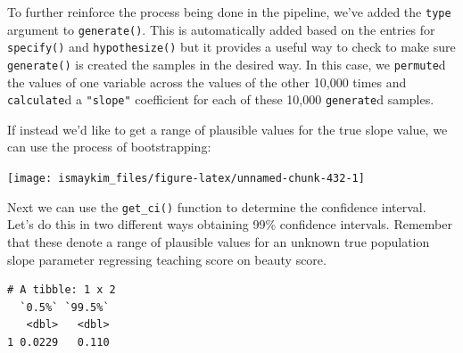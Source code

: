 \documentclass[12pt,]{krantz}
\makeatletter
\newenvironment{Shaded}{\begin{snugshade}}{\end{snugshade}}
\newcommand{\KeywordTok}[1]{\textcolor[rgb]{0.27,0.27,0.27}{\textbf{#1}}}
\newcommand{\DataTypeTok}[1]{\textcolor[rgb]{0.27,0.27,0.27}{#1}}
\newcommand{\FloatTok}[1]{\textcolor[rgb]{0.06,0.06,0.06}{#1}}
\newcommand{\StringTok}[1]{\textcolor[rgb]{0.5,0.5,0.5}{#1}}
\newcommand{\OperatorTok}[1]{\textcolor[rgb]{0.43,0.43,0.43}{\textbf{#1}}}
\newcommand{\NormalTok}[1]{#1}
\newenvironment{kframe}{%
\medskip{}
\setlength{\fboxsep}{.8em}
 \def\at@end@of@kframe{}%
 \ifinner\ifhmode%
  \def\at@end@of@kframe{\end{minipage}}%
  \begin{minipage}{\columnwidth}%
 \fi\fi%
 \def\FrameCommand##1{\hskip\@totalleftmargin \hskip-\fboxsep
 \colorbox{shadecolor}{##1}\hskip-\fboxsep
     \hskip-\linewidth \hskip-\@totalleftmargin \hskip\columnwidth}%
 \MakeFramed {\advance\hsize-\width
   \@totalleftmargin\z@ \linewidth\hsize
   \@setminipage}}%
 {\par\unskip\endMakeFramed%
 \at@end@of@kframe}
\renewenvironment{Shaded}{\begin{kframe}}{\end{kframe}}
\makeatother
\begin{document}
To further reinforce the process being done in the pipeline, we've added
the \texttt{type} argument to \texttt{generate()}. This is automatically
added based on the entries for \texttt{specify()} and
\texttt{hypothesize()} but it provides a useful way to check to make
sure \texttt{generate()} is created the samples in the desired way. In
this case, we \texttt{permute}d the values of one variable across the
values of the other 10,000 times and \texttt{calculate}d a
\texttt{"slope"} coefficient for each of these 10,000 \texttt{generate}d
samples.

If instead we'd like to get a range of plausible values for the true
slope value, we can use the process of bootstrapping:

\begin{Shaded}
\end{Shaded}

\begin{center}\texttt{[image: ismaykim\_files/figure-latex/unnamed-chunk-432-1]} \end{center}

Next we can use the \texttt{get\_ci()} function to determine the
confidence interval. Let's do this in two different ways obtaining 99\%
confidence intervals. Remember that these denote a range of plausible
values for an unknown true population slope parameter regressing
teaching score on beauty score.

\begin{Shaded}
\end{Shaded}

\begin{verbatim}
# A tibble: 1 x 2
  `0.5%` `99.5%`
   <dbl>   <dbl>
1 0.0229   0.110
\end{verbatim}

\begin{Shaded}
\end{Shaded}
\end{document}
